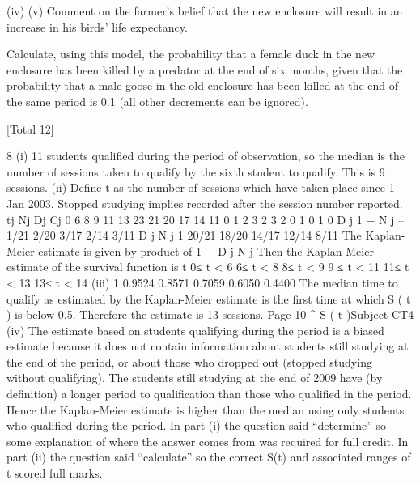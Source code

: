\documentclass[a4paper,12pt]{article}
\begin{document}
\begin{enumerate}
 
(iv)
(v)
Comment on the farmer’s belief that the new enclosure will result in an
increase in his birds’ life expectancy.
 
Calculate, using this model, the probability that a female duck in the new
enclosure has been killed by a predator at the end of six months, given that the
probability that a male goose in the old enclosure has been killed at the end of
the same period is 0.1 (all other decrements can be ignored).

[Total 12]



8
(i)
11 students qualified during the period of observation, so the median is the
number of sessions taken to qualify by the sixth student to qualify.
This is 9 sessions.
(ii)
Define t as the number of sessions which have taken place since 1 Jan 2003.
Stopped studying implies recorded after the session number reported.
tj Nj Dj Cj
0
6
8
9
11
13 23
21
20
17
14
11 0
1
2
3
2
3 2
0
1
0
1
0
D j
1 −
N j
–
1/21
2/20
3/17
2/14
3/11
D j
N j
1
20/21
18/20
14/17
12/14
8/11
The Kaplan-Meier estimate is given by product of 1 −
D j
N j
Then the Kaplan-Meier estimate of the survival function is
t
0≤ t < 6
6≤ t < 8
8≤ t < 9
9 ≤ t < 11
11≤ t < 13
13≤ t < 14
(iii)
1
0.9524
0.8571
0.7059
0.6050
0.4400
The median time to qualify as estimated by the Kaplan-Meier estimate
is the first time at which S ( t ) is below 0.5.
Therefore the estimate is 13 sessions.
Page 10
^
S ( t )Subject CT4 %
(iv)
The estimate based on students qualifying during the period
is a biased estimate because it does not contain information
about students still studying at the end of the period, or about
those who dropped out (stopped studying without qualifying).
The students still studying at the end of 2009 have (by definition) a longer
period to qualification than those who qualified in the period.
Hence the Kaplan-Meier estimate is higher than the median using
only students who qualified during the period.
In part (i) the question said “determine” so some explanation of where the answer comes
from was required for full credit. In part (ii) the question said “calculate” so the correct S(t)
and associated ranges of t scored full marks.
\newpage


\end{enumerate}
\end{document}

